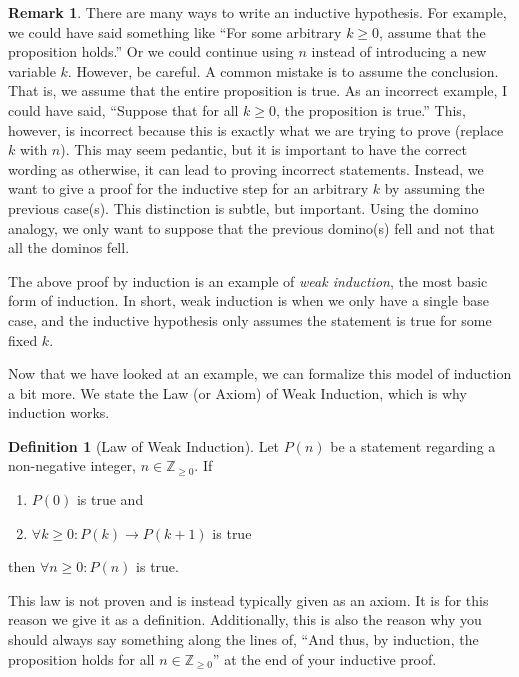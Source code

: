 \documentclass{article}
\theoremstyle{plain}
\theoremstyle{definition}
\newtheorem{definition}[theorem]{Definition}
\newtheorem{remark}[theorem]{Remark}
\newcommand{\ra}{\rightarrow}
\newcommand{\ZZ}{\mathbb{Z}_{\geq 0}}
\begin{document}
\begin{remark}
    There are many ways to write an inductive hypothesis. For example, we could have said something like ``For some arbitrary \(k \geq 0\), assume that the proposition holds.'' Or we could continue using \(n\) instead of introducing a new variable \(k\). However, be careful. A common mistake is to assume the conclusion. That is, we assume that the entire proposition is true. As an incorrect example, I could have said, ``Suppose that for all \(k \geq 0\), the proposition is true.'' This, however, is incorrect because this is exactly what we are trying to prove (replace \(k\) with \(n\)). This may seem pedantic, but it is important to have the correct wording as otherwise, it can lead to proving incorrect statements. Instead, we want to give a proof for the inductive step for an arbitrary \(k\) by assuming the previous case(s). This distinction is subtle, but important. Using the domino analogy, we only want to suppose that the previous domino(s) fell and not that all the dominos fell.
\end{remark}

The above proof by induction is an example of \emph{weak induction}, the most basic form of induction. In short, weak induction is when we only have a single base case, and the inductive hypothesis only assumes the statement is true for some fixed \(k\).

Now that we have looked at an example, we can formalize this model of induction a bit more. We state the Law (or Axiom) of Weak Induction, which is why induction works.

\begin{definition}[Law of Weak Induction]\label{law_of_weak_ind}
    Let \(P(n)\) be a statement regarding a non-negative integer, \(n \in \ZZ\). If 
    \begin{enumerate}
        \item \(P(0)\) is true and
        \item \(\forall k \geq 0 : P(k) \ra P(k+1)\) is true
    \end{enumerate}
    then \(\forall n \geq 0 : P(n)\) is true.
\end{definition}

This law is not proven and is instead typically given as an axiom. It is for this reason we give it as a definition. Additionally, this is also the reason why you should always say something along the lines of, ``And thus, by induction, the proposition holds for all \(n \in \ZZ\)'' at the end of your inductive proof. 
\end{document}
